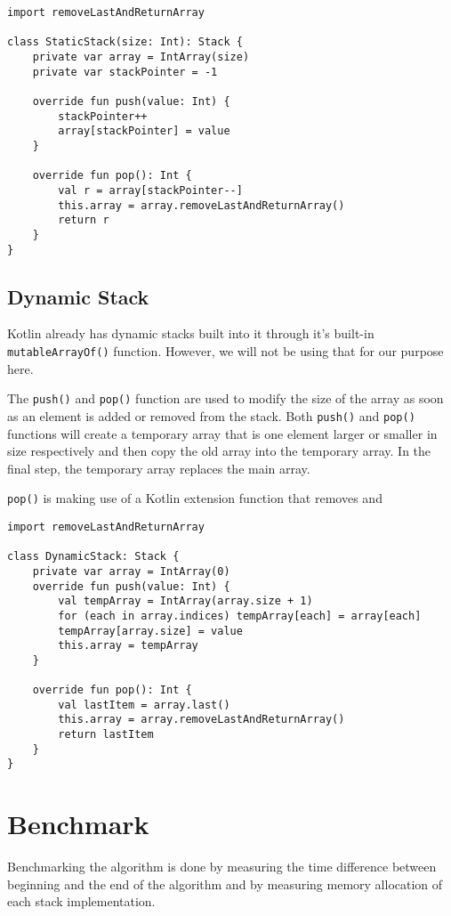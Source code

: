 \documentclass{article}
\begin{document}
\begin{verbatim}
import removeLastAndReturnArray

class StaticStack(size: Int): Stack {
    private var array = IntArray(size)
    private var stackPointer = -1

    override fun push(value: Int) {
        stackPointer++
        array[stackPointer] = value
    }

    override fun pop(): Int {
        val r = array[stackPointer--]
        this.array = array.removeLastAndReturnArray()
        return r
    }
}
\end{verbatim}




\subsection{Dynamic Stack}
Kotlin already has dynamic stacks built into it through it's built-in \texttt{mutableArrayOf()} function. However, we will not be using that for our purpose here.

The \texttt{push()} and \texttt{pop()} function are used to modify the size of the array as soon as an element is added or removed from the stack. Both \texttt{push()} and \texttt{pop()} functions will create a temporary array that is one element larger or smaller in size respectively and then copy the old array into the temporary array. In the final step, the temporary array replaces the main array.


\texttt{pop()} is making use of a Kotlin extension function that removes and 

\pagebreak

\begin{verbatim}
import removeLastAndReturnArray

class DynamicStack: Stack {
    private var array = IntArray(0)
    override fun push(value: Int) {
        val tempArray = IntArray(array.size + 1)
        for (each in array.indices) tempArray[each] = array[each]
        tempArray[array.size] = value
        this.array = tempArray
    }

    override fun pop(): Int {
        val lastItem = array.last()
        this.array = array.removeLastAndReturnArray()
        return lastItem
    }
}
\end{verbatim}


\section{Benchmark}
Benchmarking the algorithm is done by measuring the time difference between beginning and the end of the algorithm and by measuring memory allocation of each stack implementation.
\end{document}

